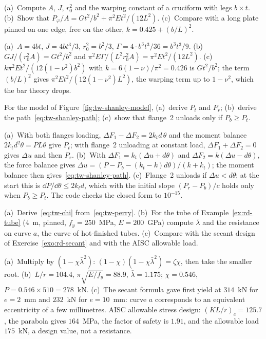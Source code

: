 \label{exo:tw-crossplate}
%
(a)~Compute $A$, $J$, $r_0^2$ and the warping constant of a cruciform with legs $b\times t$. (b)~Show that
$P_\varphi/A = Gt^2/b^2 + \pi^2Et^2/(12L^2)$. (c)~Compare with a long plate pinned on one edge, free on the other,
$k = 0.425 + (b/L)^2$.
\begin{solution}
(a)~$A = 4bt$, $J = 4bt^3/3$, $r_0^2 = b^2/3$, $\Gamma = 4\cdot b^3t^3/36 = b^3t^3/9$. (b)~$GJ/(r_0^2A) = Gt^2/b^2$ and
$\pi^2E\Gamma/(L^2r_0^2A) = \pi^2Et^2/(12L^2)$. (c)~$k\pi^2Et^2/(12(1-\nu^2)b^2)$ with $k = 6(1-\nu)/\pi^2 = 0.426$ is
$Gt^2/b^2$; the term $(b/L)^2$ gives $\pi^2Et^2/(12(1-\nu^2)L^2)$, the warping term up to $1 - \nu^2$, which the
bar theory drops.
\end{solution}

\label{exo:tw-shanley}
%
For the model of Figure~\ref{fig:tw-shanley-model}, (a)~derive $P_t$ and $P_r$; (b)~derive the
path~\eqref{eq:tw-shanley-path}; (c)~show that flange~2 unloads only if $P_b \ge P_t$.
\begin{solution}
(a)~With both flanges loading, $\Delta F_1 - \Delta F_2 = 2k_td\,\theta$ and the moment balance $2k_td^2\theta = PL\theta$
give $P_t$; with flange~2 unloading at constant load, $\Delta F_1 + \Delta F_2 = 0$ gives $\Delta u$ and then $P_r$.
(b)~With $\Delta F_1 = k_t(\Delta u + d\theta)$ and $\Delta F_2 = k(\Delta u - d\theta)$, the force balance gives
$\Delta u = (P - P_b - (k_t - k)d\theta)/(k + k_t)$; the moment balance then gives~\eqref{eq:tw-shanley-path}. (c)~Flange~2
unloads if $\Delta u < d\theta$; at the start this is $\dd P/\dd\theta \le 2k_td$, which with the initial slope
$(P_r - P_b)/c$ holds only when $P_b \ge P_t$. The code checks the closed form to $10^{-15}$.

\end{solution}

\label{exo:tw-perry}
%
(a)~Derive~\eqref{eq:tw-chi} from~\eqref{eq:tw-perry}. (b)~For the tube of Example~\ref{ex:rd-tube} ($4$~m,
pinned, $f_y = 250$~MPa, $E = 200$~GPa) compute $\bar\lambda$ and the resistance on curve $a$, the curve of
hot-finished tubes. (c)~Compare with the secant design of Exercise~\ref{exo:rd-secant} and with the AISC
allowable load.
\begin{solution}
(a)~Multiply by $(1 - \chi\bar\lambda^2)$: $(1 - \chi)(1 - \chi\bar\lambda^2) = \zeta\chi$, then take the smaller root.
(b)~$L/r = 104.4$, $\pi\sqrt{E/f_y} = 88.9$, $\bar\lambda = 1.175$; $\chi = 0.546$, $P = 0.546\times510 = 278$~kN.
(c)~The secant formula gave first yield at $314$~kN for $e = 2$~mm and $232$~kN for $e = 10$~mm: curve $a$
corresponds to an equivalent eccentricity of a few millimetres. AISC allowable stress design: $(KL/r)_c = 125.7$,
the parabola gives $164$~MPa, the factor of safety is $1.91$, and the allowable load $175$~kN, a design value,
not a resistance.
\end{solution}

